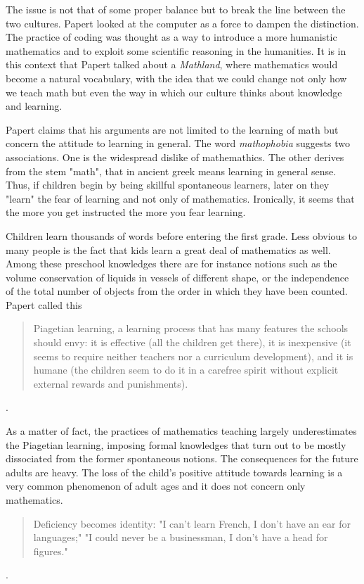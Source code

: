 The issue is not that of some proper balance but to break the line between the two cultures. Papert looked at the computer as a force to dampen the distinction. The practice of coding was thought as a way to introduce a more humanistic mathematics and to exploit some scientific reasoning in the humanities. It is in this context that Papert talked about a \textit{Mathland}, where mathematics would become a natural vocabulary, with the idea that we could change not only how we teach math but even the way in which our culture thinks about knowledge and learning.

Papert claims that his arguments are not limited to the  learning of math but concern the attitude to learning in general. The word \textit{mathophobia} suggests two associations. One is the widespread dislike of mathemathics. The other derives from the stem "math", that in ancient greek means learning in general sense. Thus, if children begin by being skillful spontaneous learners, later on they "learn" the fear of learning and not only of mathematics. Ironically, it seems that the more you get instructed the more you fear learning.

Children learn thousands of words before entering the first grade. Less obvious to many people is the fact that kids learn a great deal of mathematics as well. Among  these preschool knowledges there are for instance notions such as the volume conservation of liquids in vessels of different shape, or the independence of the total number of objects from the order in which they have been counted. Papert called this

\begin{quote}Piagetian learning, a learning process that has many features the schools should envy: it is effective (all the children get there), it is inexpensive (it seems to require neither teachers nor a curriculum development), and it is humane (the children seem to do it in a carefree spirit without explicit external rewards and punishments).
\end{quote}.

As a matter of fact, the practices of mathematics teaching largely underestimates the Piagetian learning, imposing formal knowledges that turn out to be mostly dissociated from the former spontaneous notions. The consequences for the future adults are heavy. The loss of the child's positive attitude towards learning is a very common phenomenon of adult ages and it does not concern only mathematics.

\begin{quote}
Deficiency becomes identity: "I can't learn French, I don't have an ear for languages;" "I could never be a businessman, I don't have a head for figures."
\end{quote}.  

